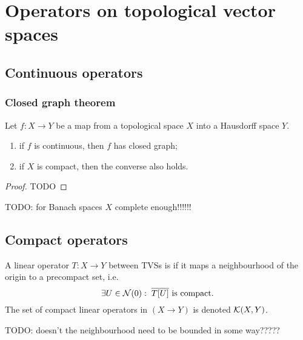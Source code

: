 \chapter{Operators on topological vector spaces}

\section{Continuous operators}
\subsection{Closed graph theorem}

\begin{theorem} \label{closedGraphTheorem}
Let $f:X\to Y$ be a map from a topological space $X$ into a Hausdorff space $Y$.
\begin{enumerate}
\item if $f$ is continuous, then $f$ has closed graph;
\item if $X$ is compact, then the converse also holds.
\end{enumerate}
\end{theorem}
\begin{proof}
TODO
\end{proof}
TODO: for Banach spaces $X$ complete enough!!!!!!


\section{Compact operators}
\begin{definition}
A linear operator $T:X\to Y$ between TVSs is  if it maps a neighbourhood of the origin to a precompact set, i.e.\ 
\[ \exists U \in \operatorname{\mathcal{N}}(0): \;  \text{$\overline{T[U]}$ is compact.} \]
The set of compact linear operators in $(X\to Y)$ is denoted $\operatorname{\mathcal{K}}(X,Y)$.
\end{definition}
TODO: doesn't the neighbourhood need to be bounded in some way?????

